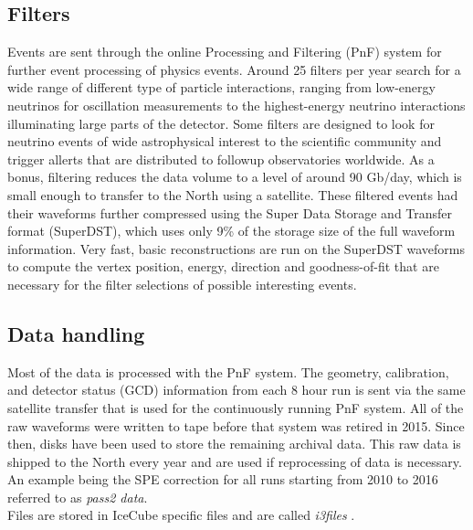 \subsection{Filters}
\label{subsec:filters}
Events are sent through the online Processing and Filtering (PnF) system for further event processing of physics events. Around 25 filters per year search for a wide range of different type of particle interactions, ranging from low-energy neutrinos for oscillation measurements to the highest-energy neutrino interactions illuminating large parts of the detector. Some filters are designed to look for neutrino events of wide astrophysical interest to the scientific community and trigger allerts that are distributed to followup observatories worldwide. As a bonus, filtering reduces the data volume to a level of around 90 Gb/day, which is small enough to transfer to the North using a satellite. These filtered events had their waveforms further compressed using the Super Data Storage and Transfer format (SuperDST), which uses only 9\% of the storage size of the full waveform information. Very fast, basic reconstructions are run on the SuperDST waveforms to compute the vertex position, energy, direction and goodness-of-fit that are necessary for the filter selections of possible interesting events. 

\subsection{Data handling}
\label{subsec:datahandling}
Most of the data is processed with the PnF system. The geometry, calibration, and detector status (GCD) information from each 8 hour run is sent via the same satellite transfer that is used for the continuously running PnF system. All of the raw waveforms were written to tape before that system was retired in 2015. Since then, disks have been used to store the remaining archival data. This raw data is shipped to the North every year and are used if reprocessing of data is necessary. An example being the SPE correction for all runs starting from 2010 to 2016 referred to as \textit{pass2 data}. \\

\noindent Files are stored in IceCube specific files and are called \textit{i3files} .

